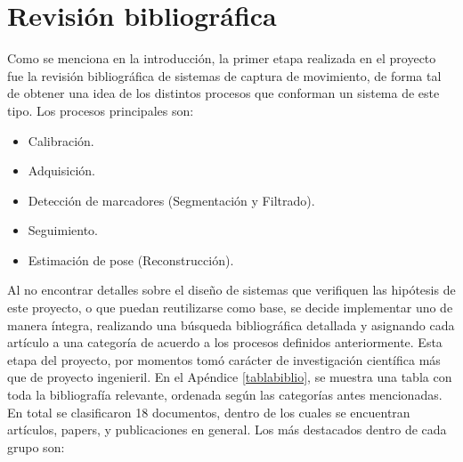 \chapter{Revisión bibliográfica}
\label{invBiblio}

Como se menciona en la introducción, la primer etapa realizada en el proyecto fue la revisión bibliográfica de sistemas de captura de movimiento, de forma tal de obtener una idea de los distintos procesos que conforman un sistema de este tipo. Los procesos principales son:

\begin{itemize}
	\item Calibración.
	\item Adquisición.
	\item Detección de marcadores (Segmentación y Filtrado).
	\item Seguimiento.
	\item Estimación de pose (Reconstrucción).
\end{itemize}

Al no encontrar detalles sobre el diseño de sistemas que verifiquen las hipótesis de este proyecto, o que puedan reutilizarse como base, se decide implementar uno de manera íntegra, realizando una búsqueda bibliográfica detallada y asignando cada artículo a una categoría de acuerdo a los procesos definidos anteriormente. Esta etapa del proyecto, por momentos tomó carácter de investigación científica más que de proyecto ingenieril. 
En el Apéndice \ref{tablabiblio}, se muestra una tabla con toda la bibliografía relevante, ordenada según las categorías antes mencionadas.
\\ 

En total se clasificaron 18 documentos, dentro de los cuales se encuentran artículos, papers, y publicaciones en general. Los más destacados dentro de cada grupo son:

